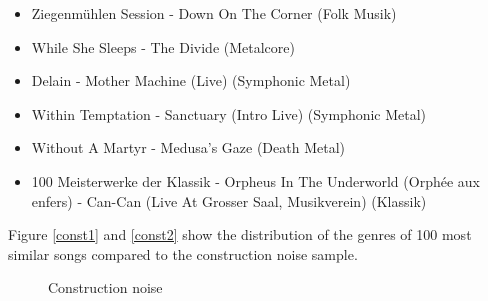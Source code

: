 \begin{itemize}
	\setlength\itemsep{-0.5em}
	\item Ziegenm\"uhlen Session - Down On The Corner (Folk Musik)
	\item While She Sleeps - The Divide (Metalcore)
	\item Delain - Mother Machine (Live) (Symphonic Metal)
	\item Within Temptation - Sanctuary (Intro Live) (Symphonic Metal)
	\item Without A Martyr - Medusa's Gaze (Death Metal)
	\item 100 Meisterwerke der Klassik - Orpheus In The Underworld (Orph\'ee aux enfers) - Can-Can (Live At Grosser Saal, Musikverein) (Klassik)
\end{itemize}

\noindent Figure \ref{const1} and \ref{const2} show the distribution of the genres of 100 most similar songs compared to the construction noise sample.  

\begin{figure}[htbp]
	\centering
	\caption{Construction noise}
	\label{fig:constn}
\end{figure}

